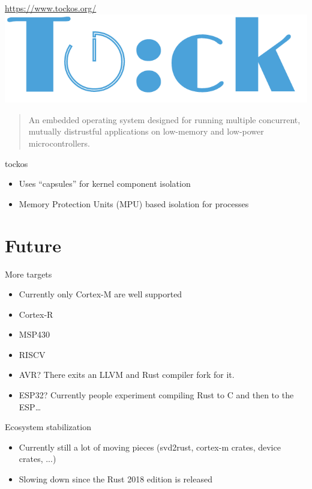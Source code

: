 \documentclass[aspectratio=1610,14pt,t]{beamer}
\begin{document}
\begin{frame}[c]{\url{https://www.tockos.org/}}
  \centering
  \includegraphics[width=.8\textwidth]{img/tock.png}

  \begin{quote}
    An embedded operating system designed for running multiple concurrent,
    mutually distrustful applications on low-memory and low-power
    microcontrollers.
  \end{quote}
\end{frame}

\begin{frame}[c]{tockos}
  \begin{itemize}
    \item Uses ``capsules'' for kernel component isolation
    \item Memory Protection Units (MPU) based isolation for processes
  \end{itemize}
\end{frame}


\section{Future}

\begin{frame}[c]{More targets}
  \begin{itemize}
    \item Currently only Cortex-M are well supported
    \item Cortex-R
    \item MSP430
    \item RISCV
    \item<2-> AVR? There exits an LLVM and Rust compiler fork for it.
    \item<2-> ESP32? Currently people experiment compiling Rust to C and then
      to the ESP\ldots
  \end{itemize}
\end{frame}

\begin{frame}[c]{Ecosystem stabilization}
  \begin{itemize}
    \item Currently still a lot of moving pieces (svd2rust, cortex-m crates,
      device crates, ...)
    \item Slowing down since the Rust 2018 edition is released
  \end{itemize}
\end{frame}
\end{document}
